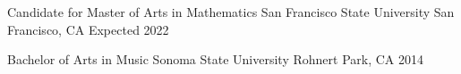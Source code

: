 \documentclass[../omelveny-cv]{subfiles}
\begin{document}


\begin{cventries}
    \cventry
    {Candidate for Master of Arts in Mathematics} %
    {San Francisco State University} %
    {San Francisco, CA} %
    {Expected 2022} %
    {}

    \vspace{-0.75em}

    \cventry
    {Bachelor of Arts in Music} %
    {Sonoma State University} %
    {Rohnert Park, CA} %
    {2014} %
    {}
\end{cventries}
\end{document}

